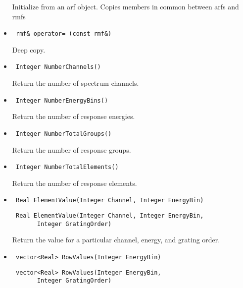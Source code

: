 \documentclass[11pt]{book}
\begin{document}
\begin{itemize}
          Initialize from an arf object. Copies members in common between arfs and rmfs

\item  \begin{verbatim} rmf& operator= (const rmf&) \end{verbatim}  

          Deep copy.

\item  \begin{verbatim} Integer NumberChannels() \end{verbatim}

          Return the number of spectrum channels.

\item  \begin{verbatim} Integer NumberEnergyBins() \end{verbatim}
  
          Return the number of response energies. 

\item  \begin{verbatim} Integer NumberTotalGroups() \end{verbatim}
  
          Return the number of response groups. 

\item  \begin{verbatim} Integer NumberTotalElements() \end{verbatim}
  
          Return the number of response elements. 

\item  \begin{verbatim} Real ElementValue(Integer Channel, Integer EnergyBin) \end{verbatim}
       \begin{verbatim} Real ElementValue(Integer Channel, Integer EnergyBin,
       Integer GratingOrder) \end{verbatim}

          Return the value for a particular channel, energy, and
          grating order.

\item  \begin{verbatim} vector<Real> RowValues(Integer EnergyBin) \end{verbatim}
       \begin{verbatim} vector<Real> RowValues(Integer EnergyBin,
       Integer GratingOrder) \end{verbatim}


\end{itemize}
\end{document}
